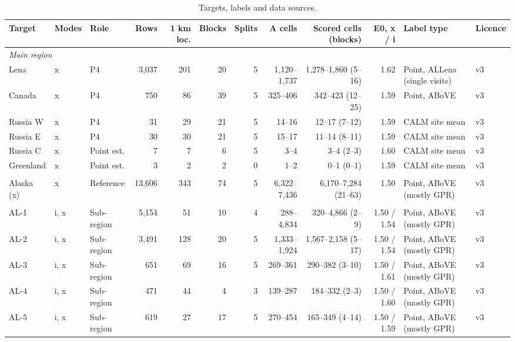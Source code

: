 \begin{table}[t]
\centering
\footnotesize
\caption{Targets, labels and data sources.}
\label{tab:data}
\begin{tabular}{lllrrrrrrrll}
\toprule
Target & Modes & Role & Rows & 1 km loc. & Blocks & Splits & A cells & Scored cells (blocks) & E0, x / i & Label type & Licence \\
\midrule
\multicolumn{12}{l}{\textit{Main region}} \\
Lena & x & P4 & 3,037 & 201 & 20 & 5 & 1,120--1,737 & 1,278--1,860 (5--16) & 1.62 & Point, ALLena (single visits) & v3 \\
Canada & x & P4 & 750 & 86 & 39 & 5 & 325--406 & 342--423 (12--25) & 1.59 & Point, ABoVE & v3 \\
Russia W & x & P4 & 31 & 29 & 21 & 5 & 14--16 & 12--17 (7--12) & 1.59 & CALM site mean & v3 \\
Russia E & x & P4 & 30 & 30 & 21 & 5 & 15--17 & 11--14 (8--11) & 1.59 & CALM site mean & v3 \\
Russia C & x & Point est. & 7 & 7 & 6 & 5 & 3--4 & 3--4 (2--3) & 1.60 & CALM site mean & v3 \\
Greenland & x & Point est. & 3 & 2 & 2 & 0 & 1--2 & 0--1 (0--1) & 1.59 & CALM site mean & v3 \\
\addlinespace
\multicolumn{12}{l}{\textit{Reference}} \\
Alaska (x) & x & Reference & 13,606 & 343 & 74 & 5 & 6,322--7,436 & 6,170--7,284 (21--63) & 1.50 & Point, ABoVE (mostly GPR) & v3 \\
\addlinespace
\multicolumn{12}{l}{\textit{Sub-region}} \\
AL-1 & i, x & Sub-region & 5,154 & 51 & 10 & 4 & 288--4,834 & 320--4,866 (2--9) & 1.50 / 1.54 & Point, ABoVE (mostly GPR) & v3 \\
AL-2 & i, x & Sub-region & 3,491 & 128 & 20 & 5 & 1,333--1,924 & 1,567--2,158 (5--17) & 1.50 / 1.54 & Point, ABoVE (mostly GPR) & v3 \\
AL-3 & i, x & Sub-region & 651 & 69 & 16 & 5 & 269--361 & 290--382 (3--10) & 1.50 / 1.61 & Point, ABoVE (mostly GPR) & v3 \\
AL-4 & i, x & Sub-region & 471 & 44 & 4 & 3 & 139--287 & 184--332 (2--3) & 1.50 / 1.60 & Point, ABoVE (mostly GPR) & v3 \\
AL-5 & i, x & Sub-region & 619 & 27 & 17 & 5 & 270--454 & 165--349 (4--14) & 1.50 / 1.59 & Point, ABoVE (mostly GPR) & v3 \\

\end{tabular}
\end{table}
